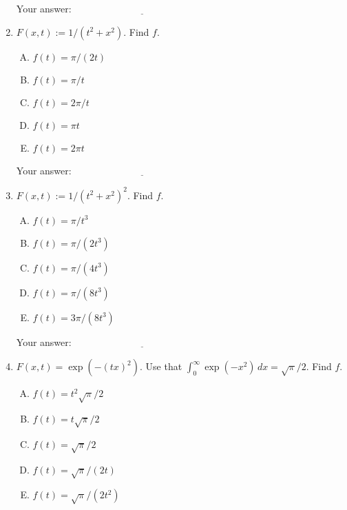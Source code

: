 \documentclass[10pt]{amsart}
\begin{document}
\begin{enumerate}
  \vspace{0.1in}
  Your answer: $\underline{\qquad\qquad\qquad\qquad\qquad\qquad\qquad}$
  \vspace{0.15in}

\item $F(x,t) := 1/(t^2 + x^2)$. Find $f$.

  \begin{enumerate}[(A)]
  \item $f(t) = \pi/(2t)$
  \item $f(t) = \pi/t$
  \item $f(t) = 2\pi/t$
  \item $f(t) = \pi t$
  \item $f(t) = 2\pi t$
  \end{enumerate}

  \vspace{0.1in}
  Your answer: $\underline{\qquad\qquad\qquad\qquad\qquad\qquad\qquad}$
  \vspace{0.15in}

\item $F(x,t) := 1/(t^2 + x^2)^2$. Find $f$.

  \begin{enumerate}[(A)]
  \item $f(t) = \pi/t^3$
  \item $f(t) = \pi/(2t^3)$
  \item $f(t) = \pi/(4t^3)$
  \item $f(t) = \pi/(8t^3)$
  \item $f(t) = 3\pi/(8t^3)$
  \end{enumerate}

  \vspace{0.1in}
  Your answer: $\underline{\qquad\qquad\qquad\qquad\qquad\qquad\qquad}$
  \vspace{0.15in}

\item $F(x,t) = \exp(-(tx)^2)$. Use that $\int_0^\infty \exp(-x^2) \, dx=
  \sqrt{\pi}/2$. Find $f$.

  \begin{enumerate}[(A)]
  \item $f(t) = t^2\sqrt{\pi}/2$
  \item $f(t) = t\sqrt{\pi}/2$
  \item $f(t) = \sqrt{\pi}/2$
  \item $f(t) = \sqrt{\pi}/(2t)$
  \item $f(t) = \sqrt{\pi}/(2t^2)$
  \end{enumerate}


\end{enumerate}
\end{document}
